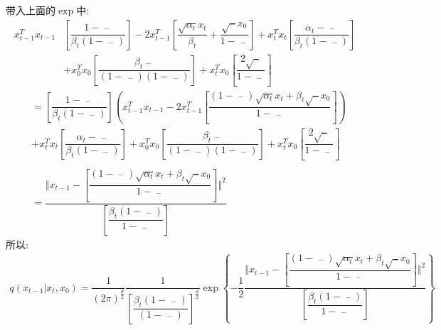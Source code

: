 \documentclass[withoutpreface,bwprint]{cumcmthesis} %
\begin{document}
	带入上面的$\exp$中:
	\begin{align*}
		x_{t-1}^Tx_{t-1} & \left[ \dfrac{ 1-\mathop{\alpha_{t}}\limits^{-} }{\beta_{t}\left( 1- \mathop{\alpha_{t-1}}\limits^{-}\right)} \right]
		-2 x_{t-1}^T\left[ \dfrac{\sqrt{\alpha_{t}}x_t}{\beta_{t}} + \dfrac{\sqrt{\mathop{\alpha_{t-1}}\limits^{-}} x_0  }{ 1 - \mathop{\alpha_{t-1}}\limits^{-}} \right]
		+ x_t^Tx_t \left[ \dfrac{\alpha_{t} -\mathop{\alpha_{t}}\limits^{-}}{\beta_{t}\left( 1-\mathop{\alpha_{t}}\limits^{-} \right)} \right] \\
		& + x_0^Tx_0\left[ \dfrac{\beta_{t} \mathop{\alpha_{t-1}}\limits^{-} }{\left( 1- \mathop{\alpha_{t-1}}\limits^{-} \right) \left( 1-\mathop{\alpha_{t}}\limits^{-} \right)} \right] 
		+ x_t^T x_0 \left[\dfrac{2\sqrt{\mathop{\alpha_{t}}\limits^{-}}}{1- \mathop{\alpha_{t}}\limits^{-}} \right]
	\end{align*}
	\begin{align*}
		 &=	\left[ \dfrac{ 1-\mathop{\alpha_{t}}\limits^{-} }{\beta_{t}\left( 1- \mathop{\alpha_{t-1}}\limits^{-}\right)} \right] \left( x_{t-1}^Tx_{t-1}
		 	-2x_{t-1}^T\left[ \dfrac{\left(1-\mathop{\alpha_{t-1}}\limits^{-} \right)\sqrt{\alpha_{t}}x_t+\beta_{t} \sqrt{\mathop{\alpha_{t-1}}\limits^{-}} x_0}{1-\mathop{\alpha_{t}}\limits^{-}} \right]
		  \right)
		  \\
		 & + x_t^Tx_t \left[ \dfrac{\alpha_{t} -\mathop{\alpha_{t}}\limits^{-}}{\beta_{t}\left( 1-\mathop{\alpha_{t}}\limits^{-} \right)} \right] 
		  + x_0^Tx_0\left[ \dfrac{\beta_{t} \mathop{\alpha_{t-1}}\limits^{-} }{\left( 1- \mathop{\alpha_{t-1}}\limits^{-} \right) \left( 1-\mathop{\alpha_{t}}\limits^{-} \right)} \right]  + x_t^T x_0 \left[\dfrac{2\sqrt{\mathop{\alpha_{t}}\limits^{-}}}{1- \mathop{\alpha_{t}}\limits^{-}} \right] \\\\
		 &= \dfrac{\Vert x_{t-1} - \left[ \dfrac{\left(1-\mathop{\alpha_{t-1}}\limits^{-} \right)\sqrt{\alpha_{t}}x_t+\beta_{t} \sqrt{\mathop{\alpha_{t-1}}\limits^{-}} x_0}{1-\mathop{\alpha_{t}}\limits^{-}} \right] \Vert^2}
		 {\left[ \dfrac{\beta_{t}\left( 1- \mathop{\alpha_{t-1}}\limits^{-}\right)}{ 1-\mathop{\alpha_{t}}\limits^{-} } \right]}
	\end{align*}
	所以:
	\begin{align*}
		q(x_{t-1}|x_t,x_0)= \dfrac{1}{\left( 2\pi \right)^{\frac{d}{2}}} \dfrac{1 }{ \left[ \dfrac{  \beta_{t}\left( 1 - \mathop{\alpha_{t-1}}\limits^{-}  \right) }{\left( 1-\mathop{\alpha_{t}}\limits^{-} \right) } \right]^\frac{d}{2} } \exp \left\{ -\dfrac{1}{2} \dfrac{\Vert x_{t-1} - \left[ \dfrac{\left(1-\mathop{\alpha_{t-1}}\limits^{-} \right)\sqrt{\alpha_{t}}x_t+\beta_{t} \sqrt{\mathop{\alpha_{t-1}}\limits^{-}} x_0}{1-\mathop{\alpha_{t}}\limits^{-}} \right] \Vert^2}
		{\left[ \dfrac{\beta_{t}\left( 1- \mathop{\alpha_{t-1}}\limits^{-}\right)}{ 1-\mathop{\alpha_{t}}\limits^{-} } \right]} \right\}
	\end{align*}
\end{document}
